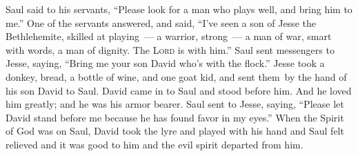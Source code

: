 \begin{inparaenum}
     Saul said to his servants, ``Please look for a man who plays well, and bring him to me.''%
     One of the servants answered, and said, ``I've seen a son of Jesse the Bethlehemite, skilled at playing~--- a warrior, strong~--- a man of war, smart with words, a man of dignity. The \textsc{Lord} is with him.''%
     Saul sent messengers to Jesse, saying, ``Bring me your son David who's with the flock.''%
     Jesse took a donkey, bread, a bottle of wine, and one goat kid, and sent them\understood\ by the hand of his son David to Saul.%
     David came in to Saul and stood before him. And he loved him greatly; and he was his armor bearer.%
     Saul sent to Jesse, saying, ``Please let David stand before me because he has found favor in my eyes.''%
     When the Spirit of God was on Saul, David took the lyre and played with his hand and Saul felt relieved and it was good to him and the evil spirit departed from him.%
\end{inparaenum}
